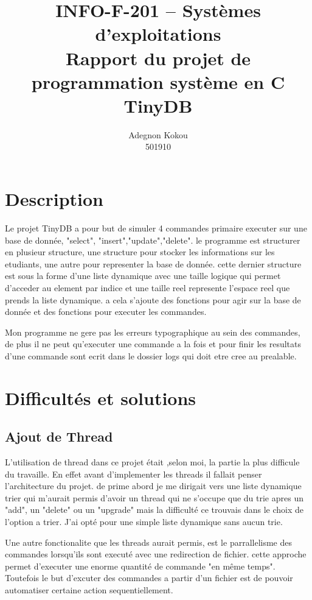 \documentclass[a4paper, 12pt]{article}
\begin{document}
\tableofcontents

\title{INFO-F-201 – Systèmes d’exploitations\\
Rapport du projet de programmation système en C
TinyDB}
\author{Adegnon Kokou\\501910}
\maketitle{}
\section{Description}

Le projet TinyDB a pour but de simuler 4 commandes primaire executer sur une base de donnée, "select", "insert","update","delete".
le programme est structurer en plusieur structure, une structure pour stocker les informations sur les etudiants, une autre pour representer la base de donnée.
cette dernier structure est sous la forme d'une liste dynamique avec une taille logique qui permet d'acceder au element par indice et une taille reel represente l'espace reel
que prends la liste dynamique. a cela s'ajoute des fonctions pour agir sur la base de donnée et des fonctions pour executer les commandes.

Mon programme ne gere pas les erreurs typographique au sein des commandes, de plus il ne peut qu'executer une commande a la fois et pour finir les resultats d'une commande sont ecrit 
dans le dossier logs qui doit etre cree au prealable.

\section{Difficultés et solutions}

	\subsection{Ajout de Thread}
L'utilisation de thread dans ce projet était ,selon moi, la partie la plus difficule
du travaille. En effet avant d'implementer les threads il fallait penser 
l'architecture du projet. de prime abord je me dirigait vers une liste dynamique trier qui m'aurait permis d'avoir un thread qui
ne s'occupe que du trie apres un "add", un "delete" ou un "upgrade" mais la difficulté ce trouvais dans le choix de l'option a trier.
J'ai opté pour une simple liste dynamique sans aucun trie.

Une autre fonctionalite que les threads aurait permis, est le parrallelisme des commandes lorsqu'ils sont executé avec une redirection de fichier.
cette approche permet d'executer une enorme quantité de commande "en même temps". Toutefois le but d'excuter des commandes a partir d'un fichier est de pouvoir
automatiser certaine action sequentiellement.
\end{document}

